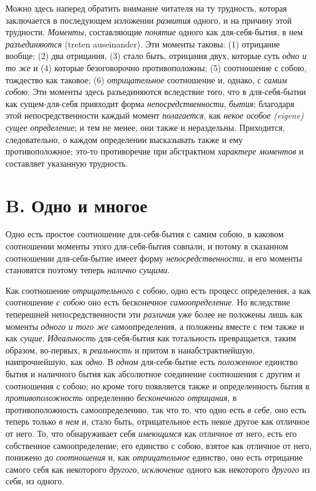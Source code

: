 Можно здесь наперед обратить внимание читателя на ту трудность, которая
заключается в последующем изложении {\em развития}
одного, и на причину этой трудности. {\em Моменты},
составляющие {\em понятие} одного как для-себя-бытия, в
нем {\em разъединяются} (treten auseinander). Эти
моменты таковы: (1) отрицание вообще; (2) два отрицания, (3) стало быть,
отрицания двух, которые суть {\em одно и то же} и (4)
которые безоговорочно противоположны; (5) соотношение с собою, тождество
как таковое; (6) {\em отрицательное} соотношение и,
однако, с {\em самим собою}. Эти моменты здесь
разъединяются вследствие того, что в для-себя-бытии как сущем-для-себя
привходит форма {\em непосредственности},
{\em бытия}; благодаря этой непосредственности каждый
момент {\em полагается}, как
{\em некое особое (eigene) сущее определение}; и тем не
менее, они также и нераздельны. Приходится, следовательно, о каждом
определении высказывать также и ему противоположное; это-то противоречие
при абстрактном {\em характере моментов} и составляет
указанную трудность.

\section*{B. Одно и многое}
Одно есть простое соотношение для-себя-бытия с самим собою, в каковом
соотношении моменты этого для-себя-бытия совпали, и потому в сказанном
соотношении для-себя-бытие имеет форму
{\em непосредственности}, и его моменты становятся
поэтому теперь {\em налично сущими}.

Как соотношение {\em отрицательного} с собою, одно есть
процесс определения, а как соотношение {\em с собою}
оно есть бесконечное {\em самоопределение}. Но
вследствие теперешней непосредственности эти
{\em различия} уже более не положены лишь как моменты
{\em одного и того же} самоопределения, а положены
вместе с тем также и как {\em сущие}.
{\em Идеальность} для-себя-бытия как тотальность
превращается, таким образом, во-первых, в
{\em реальность} и притом в наиабстрактнейшую,
наипрочнейшую, как {\em одно}. В
{\em одном} для-себя-бытие есть
{\em положенное} единство бытия и наличного бытия как
абсолютное соединение соотношения с другим и соотношения с собою; но кроме
того появляется также и определенность бытия в
{\em противоположность} определению
{\em бесконечного отрицания}, в противоположность
самоопределению, так что то, что одно есть {\em в
себе}, оно есть теперь только {\em в нем} и, стало
быть, отрицательное есть некое другое как отличное от него. То, что
обнаруживает себя {\em имеющимся} как отличное от него,
есть его собственное самоопределение; его единство с собою, взятое как
отличное от него, понижено до {\em соотношения} и, как
{\em отрицательное} единство, оно есть отрицание самого
себя как некоторого {\em другого},
{\em исключение} одного как некоторого
{\em другого} из себя, из одного.

